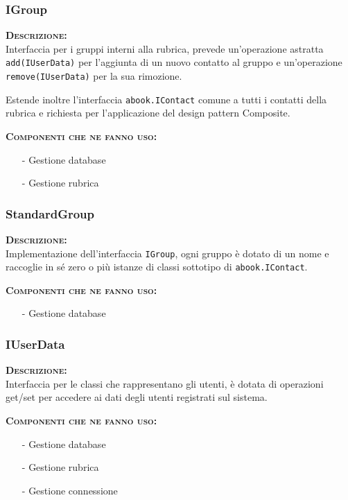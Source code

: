 \subsubsection{IGroup}
\begin{description}
	\item{\scshape\bfseries Descrizione:}\\
Interfaccia per i gruppi interni alla rubrica, prevede un'operazione astratta \texttt{add(IUserData)} per l'aggiunta di un nuovo contatto al gruppo e un'operazione \texttt{remove(IUserData)} per la sua rimozione.

Estende inoltre l'interfaccia \texttt{abook.IContact} comune a tutti i contatti della rubrica e richiesta per l'applicazione del design pattern Composite.
	\item{\scshape\bfseries Componenti che ne fanno uso:} 
	  \begin{itemize}[noitemsep,nolistsep]
	    \item[-] Gestione database
	    \item[-] Gestione rubrica
	  \end{itemize}
\end{description}

\subsubsection{StandardGroup}
\begin{description}
	\item{\scshape\bfseries Descrizione:}\\
Implementazione dell'interfaccia \texttt{IGroup}, ogni gruppo è dotato di un nome e raccoglie in sé zero o più istanze di classi sottotipo di \texttt{abook.IContact}.
	\item{\scshape\bfseries Componenti che ne fanno uso:}
	  \begin{itemize}[noitemsep,nolistsep]
	    \item[-] Gestione database
	  \end{itemize}
\end{description}

\subsubsection{IUserData}
\begin{description}
	\item{\scshape\bfseries Descrizione:}\\
Interfaccia per le classi che rappresentano gli utenti, è dotata di operazioni get/set per accedere ai dati degli utenti registrati sul sistema.
	\item{\scshape\bfseries Componenti che ne fanno uso:}
	\begin{itemize}[noitemsep,nolistsep]
	  \item[-] Gestione database
	  \item[-] Gestione rubrica
	  \item[-] Gestione connessione
	\end{itemize}
\end{description}

